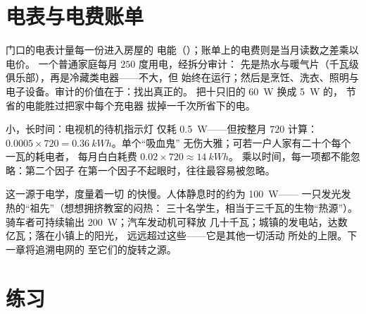 \section{电表与电费账单}

\begin{example}[读懂账单]\label{ex:g9:electric-power-energy:bill}
门口的电表计量每一份进入房屋的
电能（）；账单上的电费则是当月读数之差乘以电价。
一个普通家庭每月 $250$ 度用电，经拆分审计：
先是热水与暖气片（千瓦级
俱乐部），再是冷藏类电器——不大，但
始终在运行；然后是烹饪、洗衣、照明与
电子设备。审计的价值在于：找出真正的。
把十只旧的 \qty{60}{W} 换成 \qty{5}{W} 的，
节省的电能胜过把家中每个充电器
拔掉一千次所省下的电。
\end{example}

\begin{example}[待机“吸血鬼”]\label{ex:g9:electric-power-energy:standby}
小，长时间：电视机的待机指示灯
仅耗 \qty{0.5}{W}——但按整月 $720$ 计算：
$0.0005 \times 720 = \qty{0.36}{kWh}$。单个“吸血鬼”
无伤大雅；可若一户人家有二十个每个一瓦的耗电者，
每月白白耗费 $0.02 \times 720 \approx \qty{14}{kWh}$。
乘以时间，每一项都不能忽略：第二个因子
在第一个因子不起眼时，往往最容易被忽略。
\end{example}

\begin{remark}[功率在更广阔的世界中]\label{rem:g9:electric-power-energy:wider}
这一源于电学，度量着一切
的快慢。人体静息时的约为 \qty{100}{W}——
一只发光发热的“祖先”（想想拥挤教室的闷热：
三十名学生，相当于三千瓦的生物“热源”）。
骑车者可持续输出 \qty{200}{W}；汽车发动机可释放
几十千瓦；城镇的发电站，达数
亿瓦；落在小镇上的阳光，
远远超过这些——它是其他一切活动
所处的上限。下一章将追溯电网的
至它们的旋转之源。
\end{remark}

\section{练习}

